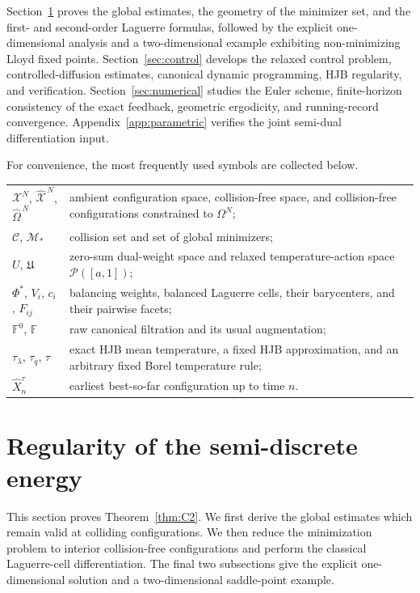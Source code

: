 \documentclass[11pt]{article}
\def\Mc{{\mathcal M}}
\def\Xc{{\mathcal X}}
\def\hOm{\widehat{\Omega}^{\,N}}
\def\hX{\widehat{\Xc}^{\,N}}
\newcommand{\Coll}{\mathscr C}
\newcommand{\Record}{\widehat X}
\theoremstyle{definition}
\theoremstyle{remark}
\numberwithin{equation}{section}
\begin{document}
Section~\ref{sec:objective} proves the global estimates, the geometry of the minimizer set, and the
first- and second-order Laguerre formulas, followed by the explicit one-dimensional analysis and a
two-dimensional example exhibiting non-minimizing Lloyd fixed points.  Section~\ref{sec:control}
develops the relaxed control problem, controlled-diffusion estimates, canonical dynamic programming,
HJB regularity, and verification.  Section~\ref{sec:numerical} studies the Euler scheme,
finite-horizon consistency of the exact feedback, geometric ergodicity, and running-record convergence.
Appendix~\ref{app:parametric} verifies the joint semi-dual differentiation input.

For convenience, the most frequently used symbols are collected below.
\begin{center}
\renewcommand{\arraystretch}{1.15}
\begin{tabular}{@{}p{}p{}@{}}
$\Xc^N$, $\hX$, $\hOm$ & ambient configuration space, collision-free space, and collision-free configurations constrained to $\Omega^N$;\\
$\Coll$, $\Mc_*$ & collision set and set of global minimizers;\\
$U$, $\mathfrak U$ & zero-sum dual-weight space and relaxed temperature-action space $\mathcal P([a,1])$;\\
$\Phi^*$, $V_i$, $c_i$, $F_{ij}$ & balancing weights, balanced Laguerre cells, their barycenters, and their pairwise facets;\\
$\mathbb F^0$, $\mathbb F$ & raw canonical filtration and its usual augmentation;\\
$\tau_\lambda$, $\tau_q$, $\tau$ & exact HJB mean temperature, a fixed HJB approximation, and an arbitrary fixed Borel temperature rule;\\
$\Record_n^\tau$ & earliest best-so-far configuration up to time $n$.
\end{tabular}
\end{center}

\section{Regularity of the semi-discrete energy}\label{sec:objective}


This section proves Theorem~\ref{thm:C2}.  We first derive the global estimates which remain valid
at colliding configurations.  We then reduce the minimization problem to interior collision-free
configurations and perform the classical Laguerre-cell differentiation.  The final two subsections
give the explicit one-dimensional solution and a two-dimensional saddle-point example.
\end{document}
